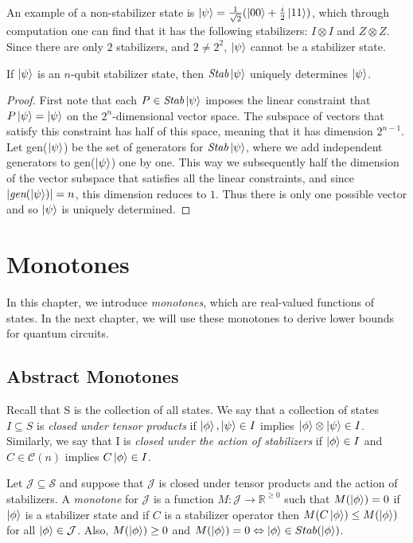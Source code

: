 \documentclass[12pt]{dalthesis}
\begin{document}
An example of a non-stabilizer state is $\ket{\psi} = \frac{1}{\sqrt{2}}(\ket{00} + \frac{i}{2} \ket{11})$, which through computation one can find that it has the following stabilizers: $I \otimes I$ and $Z \otimes Z$. Since there are only $2$ stabilizers, and $2 \neq 2^2$, $\ket{\psi}$ cannot be a stabilizer state.

\begin{theorem}
If $\ket{\psi}$ is an $n$-qubit stabilizer state, then $\textit{Stab}\ket{\psi}$ uniquely determines $\ket{\psi}$.
\end{theorem}
\begin{proof}
First note that each $P \in \textit{Stab}\ket{\psi}$ imposes the linear constraint that $P\ket{\psi} = \ket{\psi}$ on the $2^n$-dimensional vector space. The subspace of vectors that satisfy this constraint has half of this space, meaning that it has dimension $2^{n-1}$. Let gen($\ket{\psi}$) be the set of generators for $\textit{Stab}\ket{\psi}$, where we add independent generators to gen($\ket{\psi}$) one by one. This way we subsequently half the dimension of the vector subspace that satisfies all the linear constraints, and since $|\textit{gen}(\ket{\psi})| = n$, this dimension reduces to $1$. Thus there is only one possible vector and so $\ket{\psi}$ is uniquely determined.
\end{proof}

\chapter{Monotones}
\label{monotones}
In this chapter, we introduce \emph{monotones}, which are real-valued functions of states. In the next chapter, we will use these monotones to derive lower bounds for quantum circuits.  

\section{Abstract Monotones}
Recall that S is the collection of all states. We say that a collection of states $I \subseteq S$ is \emph{closed under tensor products} if $\ket{\phi}, \ket{\psi} \in I$ implies $\ket{\phi} \otimes \ket{\psi} \in I$. Similarly, we say that I is \emph{closed under the action of stabilizers} if $\ket{\phi} \in I$ and $C \in \mathcal{C}(n)$ implies $C\ket{\phi} \in I$.

\begin{definition}
Let $\mathcal{J} \subseteq \mathcal{S}$ and suppose that $\mathcal{J}$ is closed under tensor products and the action of stabilizers. A \emph{monotone} for $\mathcal{J}$ is a function $M: \mathcal{J} \rightarrow \mathbb{R}^{\geq 0}$ such that $M(\ket{\phi}) = 0$ if $\ket{\phi}$ is a stabilizer state and if $C$ is a stabilizer operator then $M(C\ket{\phi}) \leq M(\ket{\phi})$ for all $\ket{\phi} \in \mathcal{J}$. Also, $M(\ket{\phi}) \geq 0$ and $M(\ket{\phi}) = 0 \Leftrightarrow \ket{\phi} \in Stab(\ket{\phi})$.
\end{definition}
\end{document}
